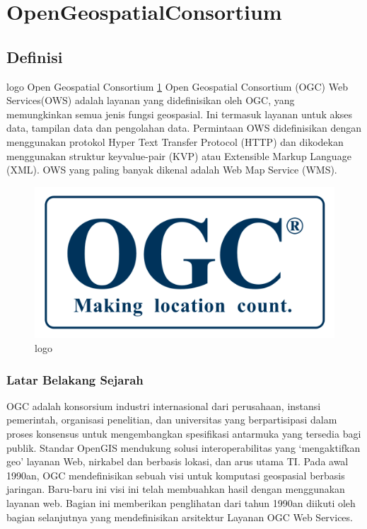 
\section{OpenGeospatialConsortium}

\subsection{Definisi}

logo Open Geospatial Consortium \ref{ogc} Open Geospatial Consortium (OGC) Web Services(OWS) adalah layanan yang didefinisikan oleh OGC, yang memungkinkan semua jenis fungsi geospasial. Ini termasuk layanan untuk akses data, tampilan data dan pengolahan data. Permintaan OWS didefinisikan dengan menggunakan protokol Hyper Text Transfer Protocol (HTTP) dan dikodekan menggunakan struktur keyvalue-pair (KVP) atau Extensible Markup Language (XML). OWS yang paling banyak dikenal adalah Web Map Service (WMS). \cite{lupp2008open} 

\begin{figure}[ht]
	\centerline{\includegraphics[width=1\textwidth]{figures/ogc.png}}
	\caption{logo}
	\label{ogc}
	\end{figure}

\subsubsection{Latar Belakang Sejarah}

OGC adalah konsorsium industri internasional dari perusahaan, instansi pemerintah, organisasi penelitian, dan universitas yang berpartisipasi dalam proses konsensus untuk mengembangkan spesifikasi antarmuka yang tersedia bagi publik. Standar OpenGIS mendukung solusi interoperabilitas yang `mengaktifkan geo' layanan Web, nirkabel dan berbasis lokasi, dan arus utama TI. Pada awal 1990an, OGC mendefinisikan sebuah visi untuk komputasi geospasial berbasis jaringan. Baru-baru ini visi ini telah membuahkan hasil dengan menggunakan layanan web. Bagian ini memberikan penglihatan dari tahun 1990an diikuti oleh bagian selanjutnya yang mendefinisikan arsitektur Layanan OGC Web Services. 

